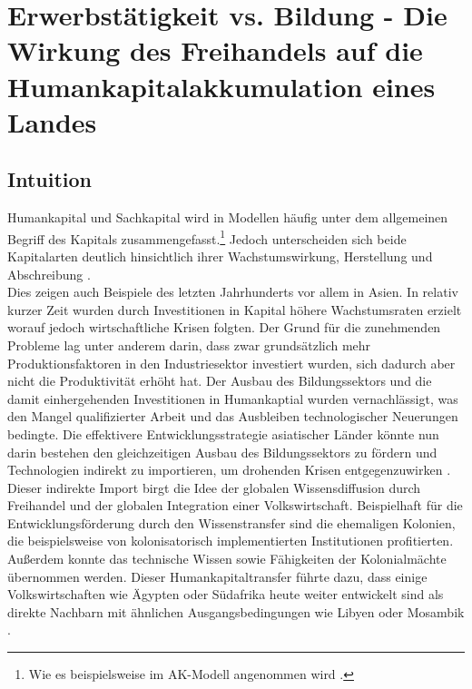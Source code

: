 

\chapter{Erwerbstätigkeit vs. Bildung - \newline
Die Wirkung des Freihandels auf die Humankapitalakkumulation eines Landes}
\label{Papier2}
\section{Intuition}

Humankapital und Sachkapital wird in Modellen häufig unter dem allgemeinen Begriff des Kapitals zusammengefasst.\footnote{Wie es beispielsweise im AK-Modell angenommen wird \cite{Rebelo.1991}.} Jedoch unterscheiden sich beide Kapitalarten deutlich hinsichtlich ihrer Wachstumswirkung, Herstellung und Abschreibung \cite{Ortigueira.1997}.\\
Dies zeigen auch Beispiele des letzten Jahrhunderts vor allem in Asien. In relativ kurzer Zeit wurden durch Investitionen in Kapital h{\"o}here Wachstumsraten erzielt worauf jedoch wirtschaftliche Krisen folgten. Der Grund f{\"u}r die zunehmenden Probleme lag unter anderem darin, dass zwar grunds{\"a}tzlich mehr Produktionsfaktoren in den Industriesektor investiert wurden, sich dadurch aber nicht die Produktivit{\"a}t erh{\"o}ht hat. Der Ausbau des Bildungssektors und die damit einhergehenden Investitionen in Humankaptial wurden  vernachl{\"a}ssigt, was den Mangel qualifizierter Arbeit und das Ausbleiben technologischer Neuerungen bedingte. Die effektivere Entwicklungsstrategie asiatischer L{\"a}nder k{\"o}nnte nun darin bestehen den gleichzeitigen Ausbau des Bildungssektors zu f{\"o}rdern und Technologien indirekt zu importieren, um drohenden Krisen entgegenzuwirken \citep{Krugman.2015}. \newline
Dieser indirekte Import birgt die Idee der globalen Wissensdiffusion durch Freihandel und der globalen Integration einer Volkswirtschaft. Beispielhaft für die Entwicklungsförderung durch den Wissenstransfer sind die ehemaligen Kolonien, die beispielsweise von kolonisatorisch implementierten Institutionen profitierten. Au{\ss}erdem konnte das technische Wissen sowie Fähigkeiten der Kolonialmächte übernommen werden. Dieser Humankapitaltransfer führte dazu, dass einige Volkswirtschaften wie Ägypten oder Südafrika heute weiter entwickelt sind als direkte Nachbarn mit ähnlichen Ausgangsbedingungen wie Libyen oder Mosambik \citep{Acemoglu.2000b}.\\
